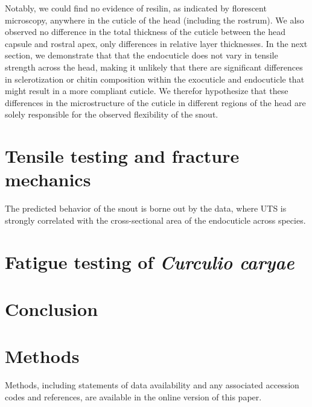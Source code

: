 \documentclass[twocolumn, linenumbers, superscriptaddress]{revtex4-1}
\begin{document}
		Notably, we could find no evidence of resilin, as indicated by florescent microscopy, anywhere in the cuticle of the head (including the rostrum).
		We also observed no difference in the total thickness of the cuticle between the head capsule and rostral apex, only differences in relative layer thicknesses.
		In the next section, we demonstrate that that the endocuticle does not vary in tensile strength across the head, making it unlikely that there are significant differences in sclerotization or chitin composition within the exocuticle and endocuticle that might result in a more compliant cuticle.
		We therefor hypothesize that these differences in the microstructure of the cuticle in different regions of the head are solely responsible for the observed flexibility of the snout.
	
	\section{Tensile testing and fracture mechanics} %
		The predicted behavior of the snout is borne out by the data, where UTS is strongly correlated with the cross-sectional area of the endocuticle across species.
		
	\section{Fatigue testing of \textit{Curculio caryae}} %

	\section{Conclusion} %

	\section{Methods}
		Methods, including statements of data availability and any associated accession codes and references, are available in the online version of this paper.
	
\end{document}
